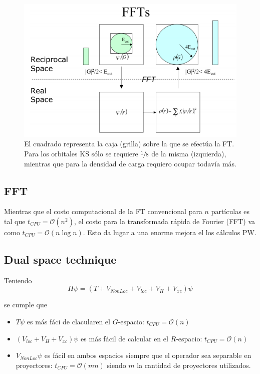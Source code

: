   \begin{figure}[H]
      \centering
      \includegraphics[scale = 0.6]{figs/D2/FFT.png}
      \caption{El cuadrado representa la caja (grilla) sobre la que se efectúa la FT. Para los orbitales KS sólo se requiere $\sfrac{1}{8}$ de la misma (izquierda), mientras que para la densidad de carga requiero  ocupar todavía más.}
      \label{fig:FFT}
  \end{figure}

\subsection{FFT}

  Mientras que el costo computacional de la FT convencional para $n$ partículas es tal que $t_{CPU} = \mathcal{O} (n^2)$, el costo para la transformada rápida de Fourier (FFT) va como $t_{CPU} = \mathcal{O} (n \log{n})$. Esto da lugar a una enorme mejora el los cálculos PW.

\subsection{Dual space technique}

  Teniendo
    $$H\psi = (T + V_{NonLoc} + V_{loc} + V_H + V_{xc})\psi$$

  se cumple que
    \begin{itemize}
      \item $T\psi$ es más fáci de clacularen el $G$-espacio: $t_{CPU} = \mathcal{O} (n)$
      \item $(V_{loc} + V_H + V_{xc})\psi$ es más fácil de calcular en el $R$-espacio: $t_{CPU} = \mathcal{O} (n)$
      \item $V_{NonLoc}\psi$ es fácil en ambos espacios siempre que el operador sea separable en proyectores: $t_{CPU} = \mathcal{O} (mn)$ siendo $m$ la cantidad de proyectores utilizados.
    \end{itemize}

